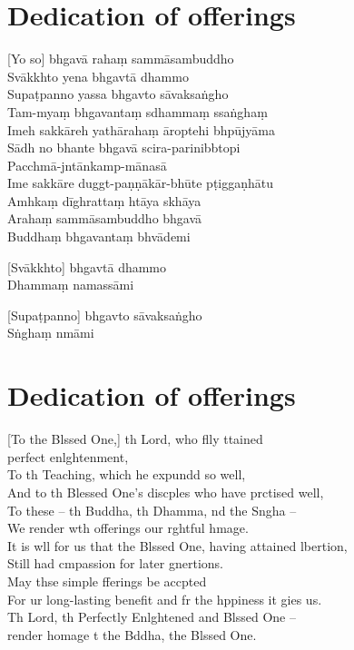 
\chapter{Dedication of offerings}%

[Yo so] bhgavā rahaṃ sammāsambuddho\\
Svākkhto yena bhgavtā dhammo\\
Supaṭpanno yassa bhgavto sāvaksaṅgho\\
Tam-myaṃ bhgavantaṃ sdhammaṃ ssaṅghaṃ\\
Imeh sakkāreh yathārahaṃ āroptehi bhpūjyāma\\
Sādh no bhante bhgavā scira-parinibbtopi\\
Pacchmā-jntānkamp-mānasā\\
Ime sakkāre duggt-paṇṇākār-bhūte pṭiggaṇhātu\\
Amhkaṃ dīghrattaṃ htāya skhāya\\
Arahaṃ sammāsambuddho bhgavā\\
Buddhaṃ bhgavantaṃ bhvādemi 

[Svākkhto] bhgavtā dhammo\\
Dhammaṃ namassāmi 

[Supaṭpanno] bhgavto sāvaksaṅgho\\
Sṅghaṃ nmāmi 

\clearpage

\chapter{Dedication of offerings}%

[To the Blssed One,] th Lord, who flly ttained\\
\vin perfect enlghtenment,\\
To th Teaching, which he expundd so well,\\
And to th Blessed One's discples who have prctised well,\\
To these -- th Buddha, th Dhamma, nd the Sngha --\\
We render wth offerings our rghtful hmage.\\
It is wll for us that the Blssed One, having attained lbertion,\\
Still had cmpassion for later gnertions.\\
May thse simple fferings be accpted\\
For ur long-lasting benefit and fr the hppiness it gies us.\\
Th Lord, th Perfectly Enlghtened and Blssed One --\\
 render homage t the Bddha, the Blssed One. 

